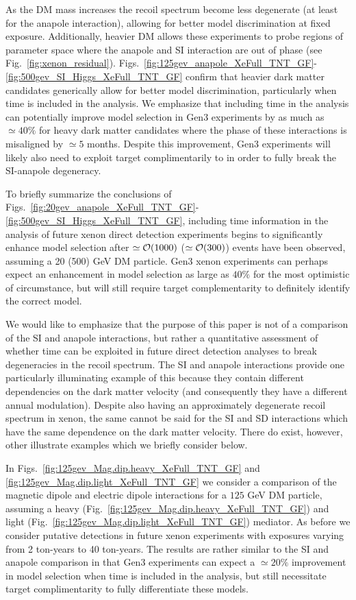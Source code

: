 \documentclass[11pt]{article}
\newcommand{\Fig}[1]{Fig.~\ref{#1}} \newcommand{\Figs}[2]{Figs.~\ref{#1} and \ref{#2}}
\begin{document}
As the DM mass increases the recoil spectrum become less degenerate (at least for the anapole interaction), allowing for better model discrimination at fixed exposure. Additionally, heavier DM allows these experiments to probe regions of parameter space where the anapole and SI interaction are out of phase (see \Fig{fig:xenon_residual}). Figs.~\ref{fig:125gev_anapole_XeFull_TNT_GF}-\ref{fig:500gev_SI_Higgs_XeFull_TNT_GF} confirm that heavier dark matter candidates generically allow for better model discrimination, particularly when time is included in the analysis. We emphasize that including time in the analysis can potentially improve model selection in Gen3 experiments by as much as $\simeq 40\%$ for heavy dark matter candidates where the phase of these interactions is misaligned by $\simeq 5$ months. Despite this improvement, Gen3 experiments will likely also need to exploit target complimentarily to in order to fully break the SI-anapole degeneracy. 

To briefly summarize the conclusions of Figs.~\ref{fig:20gev_anapole_XeFull_TNT_GF}-\ref{fig:500gev_SI_Higgs_XeFull_TNT_GF}, including time information in the analysis of future xenon direct detection experiments begins to significantly enhance model selection after $\simeq {\cal O}(1000)$ ($\simeq {\cal O}(300)$) events have been observed, assuming a 20 (500) GeV DM particle. Gen3 xenon experiments can perhaps expect an enhancement in model selection as large as $40\%$ for the most optimistic of circumstance, but will still require target complementarity to definitely identify the correct model.  

We would like to emphasize that the purpose of this paper is not of a comparison of the SI and anapole interactions, but rather a quantitative assessment of whether time can be exploited in future direct detection analyses to break degeneracies in the recoil spectrum. The SI and anapole interactions provide one particularly illuminating example of this because they contain different dependencies on the dark matter velocity (and consequently they have a different annual modulation). Despite also having an approximately degenerate recoil spectrum in xenon, the same cannot be said for the SI and SD interactions which have the same dependence on the dark matter velocity. There do exist, however, other illustrate examples which we briefly consider below.

In \Figs{fig:125gev_Mag.dip.heavy_XeFull_TNT_GF}{fig:125gev_Mag.dip.light_XeFull_TNT_GF} we consider a comparison of the magnetic dipole and electric dipole interactions for a $125$ GeV DM particle, assuming a heavy (\Fig{fig:125gev_Mag.dip.heavy_XeFull_TNT_GF}) and light (\Fig{fig:125gev_Mag.dip.light_XeFull_TNT_GF}) mediator. As before we consider putative detections in future xenon experiments with exposures varying from 2 ton-years to 40 ton-years. The results are rather similar to the SI and anapole comparison in that Gen3 experiments can expect a $\simeq 20\%$ improvement in model selection when time is included in the analysis, but still necessitate target complimentarity to fully differentiate these models.
\end{document}
